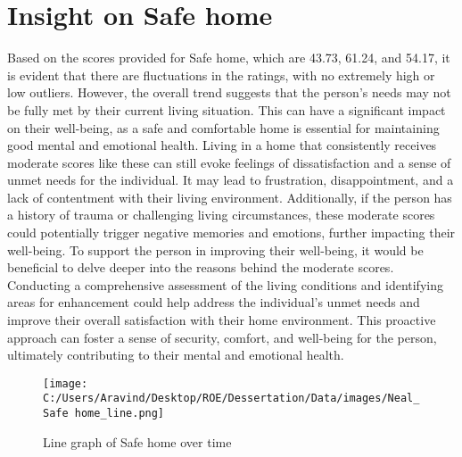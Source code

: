 \documentclass[10pt, a4paper]{article}%
\begin{document}
\section{Insight on Safe home}%
\label{sec:InsightonSafehome}%
Based on the scores provided for Safe home, which are 43.73, 61.24, and 54.17, it is evident that there are fluctuations in the ratings, with no extremely high or low outliers. However, the overall trend suggests that the person's needs may not be fully met by their current living situation. This can have a significant impact on their well{-}being, as a safe and comfortable home is essential for maintaining good mental and emotional health.\newline%
\newline%
Living in a home that consistently receives moderate scores like these can still evoke feelings of dissatisfaction and a sense of unmet needs for the individual. It may lead to frustration, disappointment, and a lack of contentment with their living environment. Additionally, if the person has a history of trauma or challenging living circumstances, these moderate scores could potentially trigger negative memories and emotions, further impacting their well{-}being.\newline%
\newline%
To support the person in improving their well{-}being, it would be beneficial to delve deeper into the reasons behind the moderate scores. Conducting a comprehensive assessment of the living conditions and identifying areas for enhancement could help address the individual's unmet needs and improve their overall satisfaction with their home environment. This proactive approach can foster a sense of security, comfort, and well{-}being for the person, ultimately contributing to their mental and emotional health.%


\begin{figure}[H]%
\centering%
\texttt{[image: C:/Users/Aravind/Desktop/ROE/Dessertation/Data/images/Neal\_Safe home\_line.png]}%
\caption{Line graph of Safe home over time}%
\end{figure}

%
\end{document}
